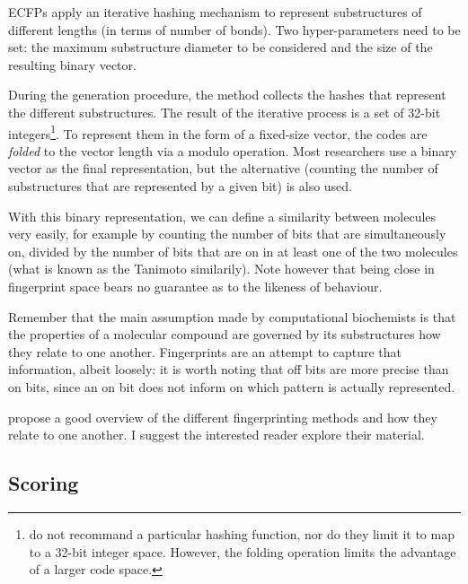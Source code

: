 \documentclass[11pt]{article}
\numberwithin{equation}{subsection}
\begin{document}
ECFPs apply an iterative hashing mechanism to represent substructures of different lengths (in terms of number of bonds). Two hyper-parameters need to be set: the maximum substructure diameter to be considered and the size of the resulting binary vector.

During the generation procedure, the method collects the hashes that represent the different substructures. The result of the iterative process is a set of 32-bit integers\footnote{\citeauthor{ecfp} do not recommand a particular hashing function, nor do they limit it to map to a 32-bit integer space. However, the folding operation limits the advantage of a larger code space.}. To represent them in the form of a fixed-size vector, the codes are \textit{folded} to the vector length via a modulo operation. Most researchers use a binary vector as the final representation, but the alternative (counting the number of substructures that are represented by a given bit) is also used.

With this binary representation, we can define a similarity between molecules very easily, for example by counting the number of bits that are simultaneously on, divided by the number of bits that are on in at least one of the two molecules (what is known as the Tanimoto similarily). Note however that being close in fingerprint space bears no guarantee as to the likeness of behaviour.

Remember that the main assumption made by computational biochemists is that the properties of a molecular compound are governed by its substructures how they relate to one another. Fingerprints are an attempt to capture that information, albeit loosely: it is worth noting that off bits are more precise than on bits, since an on bit does not inform on which pattern is actually represented.



\citet{web:fingerprints} propose a good overview of the different fingerprinting methods and how they relate to one another. I suggest the interested reader explore their material.



\subsection{Scoring}
\end{document}
